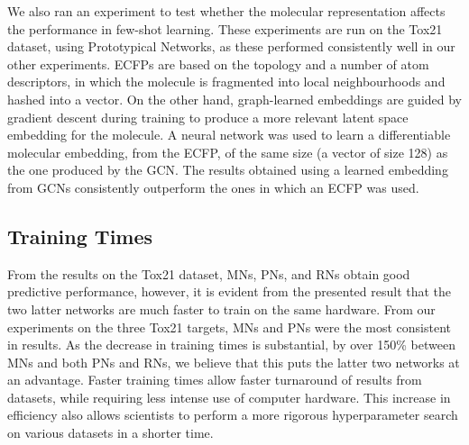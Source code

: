 We also ran an experiment to test whether the molecular representation affects the performance in few-shot learning. These experiments are run on the Tox21 dataset, using Prototypical Networks, as these performed consistently well in our other experiments. ECFPs are based on the topology and a number of atom descriptors, in which the molecule is fragmented into local neighbourhoods and hashed into a vector. On the other hand, graph-learned embeddings are guided by gradient descent during training to produce a more relevant latent space embedding for the molecule. A neural network was used to learn a differentiable molecular embedding, from the ECFP, of the same size (a vector of size 128) as the one produced by the GCN. The results obtained using a learned embedding from GCNs consistently outperform the ones in which an ECFP was used.

\subsection{Training Times}

From the results on the Tox21 dataset, MNs, PNs, and RNs obtain good predictive performance, however, it is evident from the presented result that the two latter networks are much faster to train on the same hardware. From our experiments on the three Tox21 targets, MNs and PNs were the most consistent in results. As the decrease in training times is substantial, by over 150\% between MNs and both PNs and RNs, we believe that this puts the latter two networks at an advantage. Faster training times allow faster turnaround of results from datasets, while requiring less intense use of computer hardware. This increase in efficiency also allows scientists to perform a more rigorous hyperparameter search on various datasets in a shorter time.

